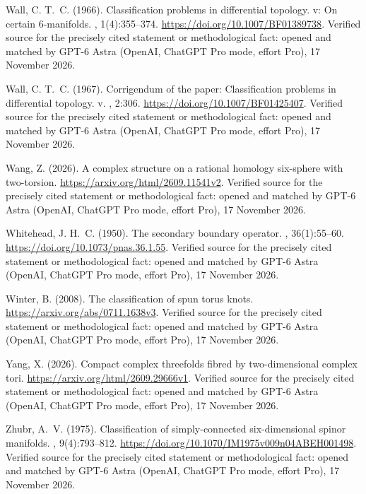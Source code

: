 \begin{thebibliography}{}
Wall, C. T.~C. (1966).
\newblock Classification problems in differential topology. v: On certain
  6-manifolds.
, 1(4):355--374.
\newblock \url{https://doi.org/10.1007/BF01389738}. Verified source for the precisely cited statement or methodological fact: opened and matched by GPT-6 Astra (OpenAI, ChatGPT Pro mode, effort Pro), 17 November 2026.

Wall, C. T.~C. (1967).
\newblock Corrigendum of the paper: Classification problems in differential
  topology. v.
, 2:306.
\newblock \url{https://doi.org/10.1007/BF01425407}. Verified source for the precisely cited statement or methodological fact: opened and matched by GPT-6 Astra (OpenAI, ChatGPT Pro mode, effort Pro), 17 November 2026.

Wang, Z. (2026).
\newblock A complex structure on a rational homology six-sphere with
  two-torsion.
\newblock \url{https://arxiv.org/html/2609.11541v2}. Verified source for the precisely cited statement or methodological fact: opened and matched by GPT-6 Astra (OpenAI, ChatGPT Pro mode, effort Pro), 17 November 2026.

Whitehead, J. H.~C. (1950).
\newblock The secondary boundary operator.
, 36(1):55--60.
\newblock \url{https://doi.org/10.1073/pnas.36.1.55}. Verified source for the precisely cited statement or methodological fact: opened and matched by GPT-6 Astra (OpenAI, ChatGPT Pro mode, effort Pro), 17 November 2026.

Winter, B. (2008).
\newblock The classification of spun torus knots.
\newblock \url{https://arxiv.org/abs/0711.1638v3}. Verified source for the precisely cited statement or methodological fact: opened and matched by GPT-6 Astra (OpenAI, ChatGPT Pro mode, effort Pro), 17 November 2026.

Yang, X. (2026).
\newblock Compact complex threefolds fibred by two-dimensional complex tori.
\newblock \url{https://arxiv.org/html/2609.29666v1}. Verified source for the precisely cited statement or methodological fact: opened and matched by GPT-6 Astra (OpenAI, ChatGPT Pro mode, effort Pro), 17 November 2026.

Zhubr, A.~V. (1975).
\newblock Classification of simply-connected six-dimensional spinor manifolds.
, 9(4):793--812.
\newblock \url{https://doi.org/10.1070/IM1975v009n04ABEH001498}. Verified source for the precisely cited statement or methodological fact: opened and matched by GPT-6 Astra (OpenAI, ChatGPT Pro mode, effort Pro), 17 November 2026.


\end{thebibliography}
